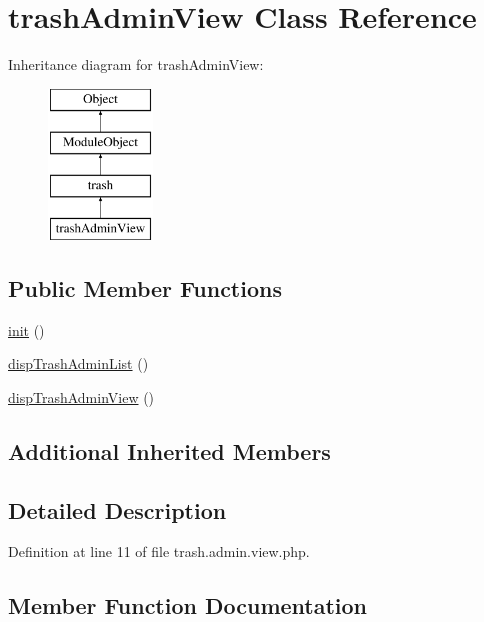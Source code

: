 \hypertarget{classtrashAdminView}{}\section{trash\+Admin\+View Class Reference}
\label{classtrashAdminView}
Inheritance diagram for trash\+Admin\+View\+:\begin{figure}[H]
\begin{center}
\leavevmode
\includegraphics[height=4.000000cm]{classtrashAdminView}
\end{center}
\end{figure}
\subsection*{Public Member Functions}
\begin{DoxyCompactItemize}
\item 
\hyperlink{classtrashAdminView_a471722f4a946b3eff0992c48f268d7eb}{init} ()
\item 
\hyperlink{classtrashAdminView_afb1f31836be3cfeda1d8b9e1f5ec9ee0}{disp\+Trash\+Admin\+List} ()
\item 
\hyperlink{classtrashAdminView_a77a13f0633df48ee6802c706d8ccf1de}{disp\+Trash\+Admin\+View} ()
\end{DoxyCompactItemize}
\subsection*{Additional Inherited Members}


\subsection{Detailed Description}


Definition at line 11 of file trash.\+admin.\+view.\+php.



\subsection{Member Function Documentation}
\mbox{\label{classtrashAdminView_afb1f31836be3cfeda1d8b9e1f5ec9ee0}} 
